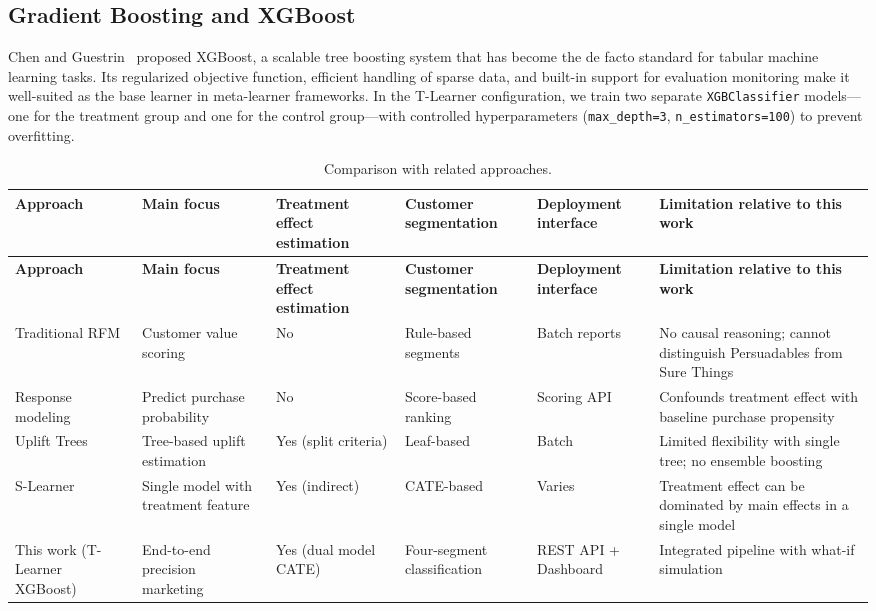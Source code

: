\documentclass[11pt,a4paper,twoside]{article}
\begin{document}
\subsection{Gradient Boosting and XGBoost}

Chen and Guestrin~\cite{chen2016xgboost} proposed XGBoost, a scalable tree boosting system that has become the de facto standard for tabular machine learning tasks. Its regularized objective function, efficient handling of sparse data, and built-in support for evaluation monitoring make it well-suited as the base learner in meta-learner frameworks. In the T-Learner configuration, we train two separate \texttt{XGBClassifier} models---one for the treatment group and one for the control group---with controlled hyperparameters (\texttt{max\_depth=3}, \texttt{n\_estimators=100}) to prevent overfitting.

\begingroup
\scriptsize
\setlength{\tabcolsep}{3pt}
\renewcommand{\arraystretch}{1.18}

\begin{longtable}{p{2.0cm} p{2.5cm} p{2.3cm} p{2.0cm} p{2.0cm} p{3.2cm}}
\caption{Comparison with related approaches.}
\label{tab:comparison_related} \\

\toprule
\textbf{Approach} &
\textbf{Main focus} &
\textbf{Treatment effect estimation} &
\textbf{Customer segmentation} &
\textbf{Deployment interface} &
\textbf{Limitation relative to this work} \\
\midrule
\endfirsthead

\toprule
\textbf{Approach} &
\textbf{Main focus} &
\textbf{Treatment effect estimation} &
\textbf{Customer segmentation} &
\textbf{Deployment interface} &
\textbf{Limitation relative to this work} \\
\midrule
\endhead

\bottomrule
\endfoot

Traditional RFM~\cite{bult1995} &
Customer value scoring &
No &
Rule-based segments &
Batch reports &
No causal reasoning; cannot distinguish Persuadables from Sure Things \\

Response modeling &
Predict purchase probability &
No &
Score-based ranking &
Scoring API &
Confounds treatment effect with baseline purchase propensity \\

Uplift Trees~\cite{rzepakowski2012} &
Tree-based uplift estimation &
Yes (split criteria) &
Leaf-based &
Batch &
Limited flexibility with single tree; no ensemble boosting \\

S-Learner~\cite{kunzel2019} &
Single model with treatment feature &
Yes (indirect) &
CATE-based &
Varies &
Treatment effect can be dominated by main effects in a single model \\

This work (T-Learner XGBoost) &
End-to-end precision marketing &
Yes (dual model CATE) &
Four-segment classification &
REST API + Dashboard &
Integrated pipeline with what-if simulation \\

\end{longtable}
\endgroup
\end{document}
